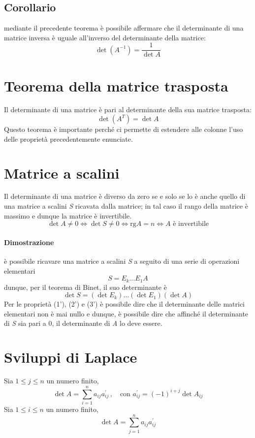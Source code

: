		\subsection{Corollario}
			mediante il precedente teorema è possibile affermare che il determinante di una matrice inversa è uguale all'inverso del determinante della matrice:
		$$ \det (A^{-1}) = \frac{1}{\det A} $$
	
	\section{Teorema della matrice trasposta}
		Il determinante di una matrice è pari al determinante della sua matrice trasposta:
		$$ \det (A^T) = \det A $$
		Questo teorema è importante perché ci permette di estendere alle colonne l'uso delle proprietà precedentemente enunciate.
	
	\section{Matrice a scalini} 
		Il determinante di una matrice è diverso da zero se e solo se lo è anche quello di una matrice a scalini \textit{S} ricavata dalla matrice; in tal caso il rango della matrice è massimo e dunque la matrice è invertibile.
		$$ \det A \neq 0 \iff \det S \neq 0 \iff \text{rg} A = n \iff A \text{ è invertibile}  $$
		
		\begin{GrayBox}
			\paragraph{Dimostrazione}
			è possibile ricavare una matrice a scalini \textit{S} a seguito di una serie di operazioni elementari
			$$ S = E_k \dots E_1 A $$
			dunque, per il teorema di Binet, il suo determinante è
			$$ \det S = (\det E_k) \dots (\det E_1) (\det A) $$
			Per le proprietà (1'), (2') e (3') è possibile dire che il determinante delle matrici elementari non è mai nullo e dunque, è possibile dire che affinché il determinante di \textit{S} sia pari a 0, il determinante di \textit{A} lo deve essere.
		\end{GrayBox}
	
	\section{Sviluppi di Laplace}
		Sia $1 \leq j \leq n$ un numero finito,
		$$ \det A = \sum_{i = 1}^{n} a_{ij} a_{ij}^{\prime} \, , \quad \text{con } a_{ij}^{\prime} = (-1)^{i + j} \det A_{ij} $$
		Sia $1 \leq i \leq n$ un numero finito,
		$$ \det A = \sum_{j = 1}^{n} a_{ij} a_{ij}^{\prime} $$
		
